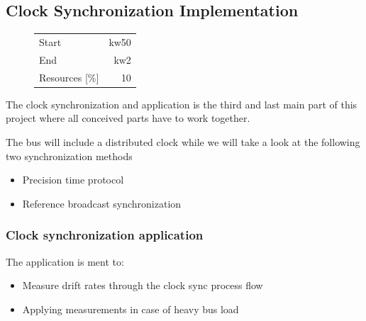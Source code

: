 \subsection{Clock Synchronization Implementation}
\begin{figure}
\begin{tabular}[t]{|lr|}
\hline
Start & kw50\\
End & kw2\\
Resources [\%] & 10\\
\hline
\end{tabular}
\end{figure}
The clock synchronization and application is the third and last main part of 
this project where all conceived parts have to work together.

The bus will include a distributed clock while we will 
take a look at the following two synchronization methods
\begin{itemize}
 \item Precision time protocol
 \item Reference broadcast synchronization
\end{itemize}

\subsubsection{Clock synchronization application}
The application is ment to:
\begin{itemize}
 \item Measure drift rates through the clock sync process flow
 \item Applying measurements in case of heavy bus load
\end{itemize}
